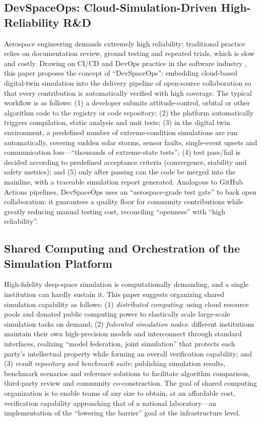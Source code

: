 \documentclass[11pt]{article}
\begin{document}
\subsection{DevSpaceOps: Cloud-Simulation-Driven High-Reliability R\&D}
Aerospace engineering demands extremely high reliability; traditional practice relies on documentation review, ground testing and repeated trials, which is slow and costly. Drawing on CI/CD and DevOps practice in the software industry \cite{devops2016}, this paper proposes the concept of ``DevSpaceOps'': embedding cloud-based digital-twin simulation into the delivery pipeline of open-source collaboration so that every contribution is automatically verified with high coverage. The typical workflow is as follows: (1) a developer submits attitude-control, orbital or other algorithm code to the registry or code repository; (2) the platform automatically triggers compilation, static analysis and unit tests; (3) in the digital twin environment, a predefined number of extreme-condition simulations are run automatically, covering sudden solar storms, sensor faults, single-event upsets and communication loss---``thousands of extreme-state tests''; (4) test pass/fail is decided according to predefined acceptance criteria (convergence, stability and safety metrics); and (5) only after passing can the code be merged into the mainline, with a traceable simulation report generated. Analogous to GitHub Actions pipelines, DevSpaceOps uses an ``aerospace-grade test gate'' to back open collaboration: it guarantees a quality floor for community contributions while greatly reducing manual testing cost, reconciling ``openness'' with ``high reliability''.

\subsection{Shared Computing and Orchestration of the Simulation Platform}
High-fidelity deep-space simulation is computationally demanding, and a single institution can hardly sustain it. This paper suggests organizing shared simulation capability as follows: (1) \emph{distributed computing}: using cloud resource pools and donated public computing power to elastically scale large-scale simulation tasks on demand; (2) \emph{federated simulation nodes}: different institutions maintain their own high-precision models and interconnect through standard interfaces, realizing ``model federation, joint simulation'' that protects each party's intellectual property while forming an overall verification capability; and (3) \emph{result repository and benchmark suite}: publishing simulation results, benchmark scenarios and reference solutions to facilitate algorithm comparison, third-party review and community co-construction. The goal of shared computing organization is to enable teams of any size to obtain, at an affordable cost, verification capability approaching that of a national laboratory---an implementation of the ``lowering the barrier'' goal at the infrastructure level.
\end{document}
